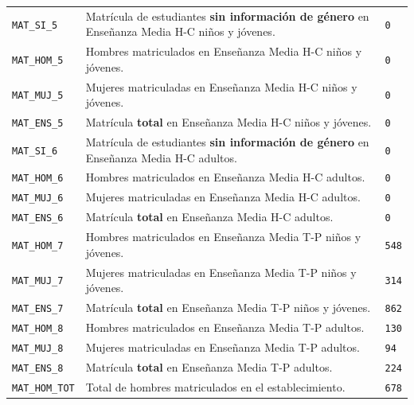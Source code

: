 \documentclass[10.5pt]{article}
\begin{document}
\begin{xltabular}{\linewidth}{@{}p{4.5cm} >{\raggedright\arraybackslash}X p{3.4cm}@{}}
\texttt{MAT\_\allowbreak{}SI\_\allowbreak{}5} & Matrícula de estudiantes \textbf{sin información de género} en Enseñanza Media H-C niños y jóvenes. & \texttt{0} \\
\texttt{MAT\_\allowbreak{}HOM\_\allowbreak{}5} & Hombres matriculados en Enseñanza Media H-C niños y jóvenes. & \texttt{0} \\
\texttt{MAT\_\allowbreak{}MUJ\_\allowbreak{}5} & Mujeres matriculadas en Enseñanza Media H-C niños y jóvenes. & \texttt{0} \\
\texttt{MAT\_\allowbreak{}ENS\_\allowbreak{}5} & Matrícula \textbf{total} en Enseñanza Media H-C niños y jóvenes. & \texttt{0} \\
\texttt{MAT\_\allowbreak{}SI\_\allowbreak{}6} & Matrícula de estudiantes \textbf{sin información de género} en Enseñanza Media H-C adultos. & \texttt{0} \\
\texttt{MAT\_\allowbreak{}HOM\_\allowbreak{}6} & Hombres matriculados en Enseñanza Media H-C adultos. & \texttt{0} \\
\texttt{MAT\_\allowbreak{}MUJ\_\allowbreak{}6} & Mujeres matriculadas en Enseñanza Media H-C adultos. & \texttt{0} \\
\texttt{MAT\_\allowbreak{}ENS\_\allowbreak{}6} & Matrícula \textbf{total} en Enseñanza Media H-C adultos. & \texttt{0} \\
\texttt{MAT\_\allowbreak{}HOM\_\allowbreak{}7} & Hombres matriculados en Enseñanza Media T-P niños y jóvenes. & \texttt{548} \\
\texttt{MAT\_\allowbreak{}MUJ\_\allowbreak{}7} & Mujeres matriculadas en Enseñanza Media T-P niños y jóvenes. & \texttt{314} \\
\texttt{MAT\_\allowbreak{}ENS\_\allowbreak{}7} & Matrícula \textbf{total} en Enseñanza Media T-P niños y jóvenes. & \texttt{862} \\
\texttt{MAT\_\allowbreak{}HOM\_\allowbreak{}8} & Hombres matriculados en Enseñanza Media T-P adultos. & \texttt{130} \\
\texttt{MAT\_\allowbreak{}MUJ\_\allowbreak{}8} & Mujeres matriculadas en Enseñanza Media T-P adultos. & \texttt{94} \\
\texttt{MAT\_\allowbreak{}ENS\_\allowbreak{}8} & Matrícula \textbf{total} en Enseñanza Media T-P adultos. & \texttt{224} \\
\texttt{MAT\_\allowbreak{}HOM\_\allowbreak{}TOT} & Total de hombres matriculados en el establecimiento. & \texttt{678} \\

\end{xltabular}
\end{document}
